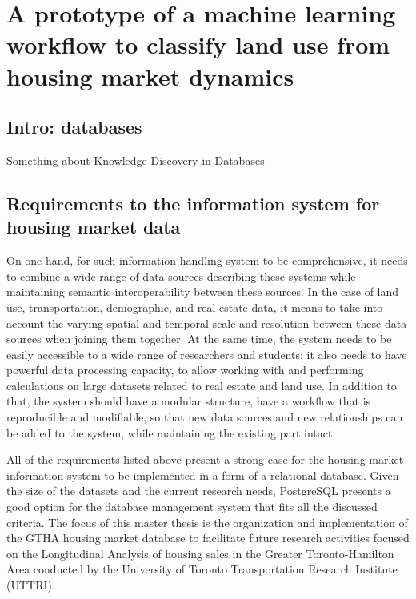 \chapter{A prototype of a machine learning workflow to classify land use from housing market dynamics} \label{ch:ml_workflow}

\section{Intro: databases} \label{sec:intro_database_design}

Something about Knowledge Discovery in Databases

\section{Requirements to the information system for housing market data} \label{sec:requirements_to_information_system}

On one hand, for such information-handling system to be comprehensive, it needs to combine a wide range of data sources describing these systems while maintaining semantic interoperability between these sources.
In the case of land use, transportation, demographic, and real estate data, it means to take into account the varying spatial and temporal scale and resolution between these data sources when joining them together.
At the same time, the system needs to be easily accessible to a wide range of researchers and students;
it also needs to have powerful data processing capacity, to allow working with and performing calculations on large datasets related to real estate and land use.
In addition to that, the system should have a modular structure, have a workflow that is reproducible and modifiable, so that new data sources and new relationships can be added to the system, while maintaining the existing part intact.

All of the requirements listed above present a strong case for the housing market information system to be implemented in a form of a relational database.
Given the size of the datasets and the current research needs, PostgreSQL presents a good option for the database management system that fits all the discussed criteria.
The focus of this master thesis is the organization and implementation of the GTHA housing market database to facilitate future research activities focused on the Longitudinal Analysis of housing sales in the Greater Toronto-Hamilton Area conducted by the University of Toronto Transportation Research Institute (UTTRI).

